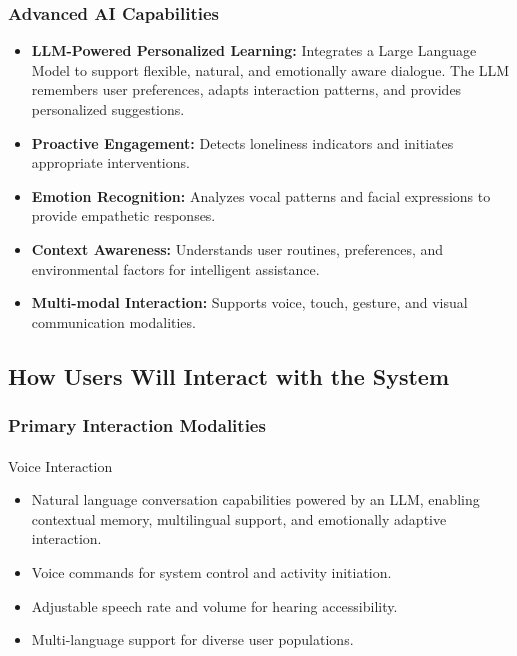 \documentclass[
  letterpaper,
  DIV=11,
  numbers=noendperiod]{scrartcl}
\makeatletter
\let\oldparagraph\paragraph
\renewcommand{\paragraph}{
    \@ifstar
      \xxxParagraphStar
      \xxxParagraphNoStar
  }
\newcommand{\xxxParagraphStar}[1]{\oldparagraph*{#1}\mbox{}}
\newcommand{\xxxParagraphNoStar}[1]{\oldparagraph{#1}\mbox{}}
\providecommand{\tightlist}{%
  \setlength{\itemsep}{0pt}\setlength{\parskip}{0pt}}\usepackage{longtable,booktabs,array}
\makeatother
\begin{document}
\subsubsection{Advanced AI Capabilities}\label{advanced-ai-capabilities}

\begin{itemize}
\tightlist
\item
  \textbf{LLM-Powered Personalized Learning:} Integrates a Large
  Language Model to support flexible, natural, and emotionally aware
  dialogue. The LLM remembers user preferences, adapts interaction
  patterns, and provides personalized suggestions.
\item
  \textbf{Proactive Engagement:} Detects loneliness indicators and
  initiates appropriate interventions.
\item
  \textbf{Emotion Recognition:} Analyzes vocal patterns and facial
  expressions to provide empathetic responses.
\item
  \textbf{Context Awareness:} Understands user routines, preferences,
  and environmental factors for intelligent assistance.
\item
  \textbf{Multi-modal Interaction:} Supports voice, touch, gesture, and
  visual communication modalities.
\end{itemize}

\subsection{How Users Will Interact with the
System}\label{how-users-will-interact-with-the-system}

\subsubsection{Primary Interaction
Modalities}\label{primary-interaction-modalities}

\paragraph{Voice Interaction}\label{voice-interaction}

\begin{itemize}
\tightlist
\item
  Natural language conversation capabilities powered by an LLM, enabling
  contextual memory, multilingual support, and emotionally adaptive
  interaction.
\item
  Voice commands for system control and activity initiation.
\item
  Adjustable speech rate and volume for hearing accessibility.
\item
  Multi-language support for diverse user populations.
\end{itemize}
\end{document}
